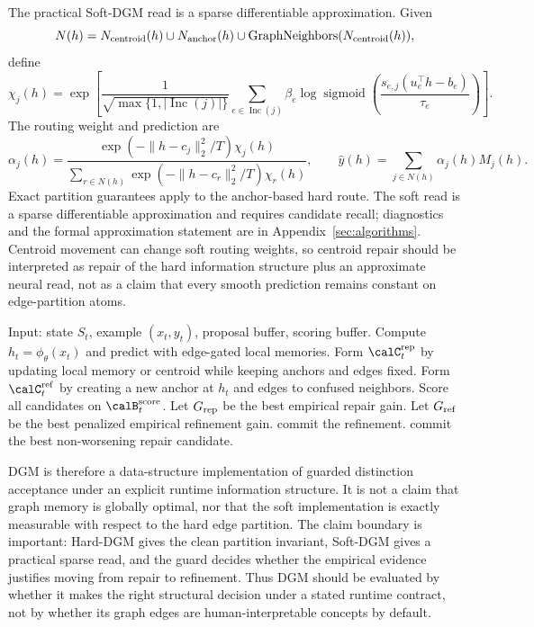 The practical Soft-DGM read is a sparse differentiable approximation.
Given
\[
N(h)=
N_{\rm centroid}(h)
\cup
N_{\rm anchor}(h)
\cup
\operatorname{GraphNeighbors}(N_{\rm centroid}(h)),
\]
define
\[
\chi_j(h)
=
\exp\left[
\frac1{\sqrt{\max\{1,|\operatorname{Inc}(j)|\}}}
\sum_{e\in\operatorname{Inc}(j)}
\beta_e
\log\operatorname{sigmoid}
\left(
\frac{s_{e,j}(u_e^\top h-b_e)}{\tau_e}
\right)
\right].
\]
The routing weight and prediction are
\[
\alpha_j(h)
=
\frac{
\exp(-\|h-c_j\|_2^2/T)\chi_j(h)
}{
\sum_{r\in N(h)}
\exp(-\|h-c_r\|_2^2/T)\chi_r(h)
},
\qquad
\hat y(h)=\sum_{j\in N(h)}\alpha_j(h)M_j(h).
\]
Exact partition guarantees apply to the anchor-based hard route.
The soft read is a sparse differentiable approximation and requires candidate recall; diagnostics and the formal approximation statement are in Appendix~\ref{sec:algorithms}.
Centroid movement can change soft routing weights, so centroid repair should be interpreted as repair of the hard information structure plus an approximate neural read, not as a claim that every smooth prediction remains constant on edge-partition atoms.

\begin{algorithm}[t]
\caption{\textsc{Guarded-DGM-Update}}
\label{alg:main-guarded-dgm}
\begin{algorithmic}[1]
\Statex Input: state $S_t$, example $(x_t,y_t)$, proposal buffer, scoring buffer.
\State Compute $h_t=\phi_\theta(x_t)$ and predict with edge-gated local memories.
\State Form $\calC_t^{\rm rep}$ by updating local memory or centroid while keeping anchors and edges fixed.
\State Form $\calC_t^{\rm ref}$ by creating a new anchor at $h_t$ and edges to confused neighbors.
\State Score all candidates on $\calB_t^{\rm score}$.
\State Let $G_{\rm rep}$ be the best empirical repair gain.
\State Let $G_{\rm ref}$ be the best penalized empirical refinement gain.
    \State commit the refinement.
\Else
    \State commit the best non-worsening repair candidate.
\EndIf
\end{algorithmic}
\end{algorithm}

DGM is therefore a data-structure implementation of guarded distinction acceptance under an explicit runtime information structure.
It is not a claim that graph memory is globally optimal, nor that the soft implementation is exactly measurable with respect to the hard edge partition.
The claim boundary is important: Hard-DGM gives the clean partition invariant, Soft-DGM gives a practical sparse read, and the guard decides whether the empirical evidence justifies moving from repair to refinement.
Thus DGM should be evaluated by whether it makes the right structural decision under a stated runtime contract, not by whether its graph edges are human-interpretable concepts by default.
